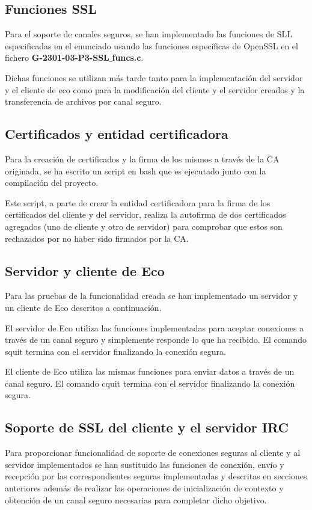 \documentclass{mathnotes}
\begin{document}
\subsection{Funciones SSL}
Para el soporte de canales seguros, se han implementado las funciones de SLL especificadas en el enunciado usando las funciones específicas de OpenSSL en el fichero \textbf{G-2301-03-P3-SSL$\_$funcs.c}.

Dichas funciones se utilizan más tarde tanto para la implementación del servidor y el cliente de eco como para la modificación del cliente y el servidor creados y la transferencia de archivos por canal seguro.

\subsection{Certificados y entidad certificadora}
Para la creación de certificados y la firma de los mismos a través de la CA originada, se ha escrito un script en bash que es ejecutado junto con la compilación del proyecto. 

Este script, a parte de crear la entidad certificadora para la firma de los certificados del cliente y del servidor, realiza la autofirma de dos certificados agregados (uno de cliente y otro de servidor) para comprobar que estos son rechazados por no haber sido firmados por la CA.

\subsection{Servidor y cliente de Eco}
Para las pruebas de la funcionalidad creada se han implementado un servidor y un cliente de Eco descritos a continuación.

El servidor de Eco utiliza las funciones implementadas para aceptar conexiones a través de un canal seguro y simplemente responde lo que ha recibido. El comando squit termina con el servidor finalizando la conexión segura. 

El cliente de Eco utiliza las mismas funciones para enviar datos a través de un canal seguro. El comando cquit termina con el servidor finalizando la conexión segura. 

\subsection{Soporte de SSL del cliente y el servidor IRC}
Para proporcionar funcionalidad de soporte de conexiones seguras al cliente y al servidor implementados se han sustituido las funciones de conexión, envío y recepción por las correspondientes seguras implementadas y descritas en secciones anteriores además de realizar las operaciones de inicialización de contexto y obtención de un canal seguro necesarias para completar dicho objetivo.
\end{document}
